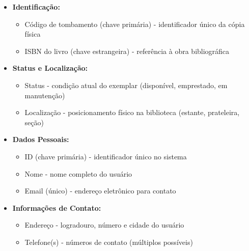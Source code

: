 \documentclass[12pt,a4paper]{article}
\begin{document}
\begin{conceptbox}[Exemplar]
\begin{itemize}[leftmargin=*]
    \item \textbf{Identificação:}
    \begin{itemize}
        \item Código de tombamento (chave primária) - identificador único da cópia física
        \item ISBN do livro (chave estrangeira) - referência à obra bibliográfica
    \end{itemize}
    \item \textbf{Status e Localização:}
    \begin{itemize}
        \item Status - condição atual do exemplar (disponível, emprestado, em manutenção)
        \item Localização - posicionamento físico na biblioteca (estante, prateleira, seção)
    \end{itemize}
\end{itemize}
\end{conceptbox}

\begin{conceptbox}[Usuário]
\begin{itemize}[leftmargin=*]
    \item \textbf{Dados Pessoais:}
    \begin{itemize}
        \item ID (chave primária) - identificador único no sistema
        \item Nome - nome completo do usuário
        \item Email (único) - endereço eletrônico para contato
    \end{itemize}
    \item \textbf{Informações de Contato:}
    \begin{itemize}
        \item Endereço - logradouro, número e cidade do usuário
        \item Telefone(s) - números de contato (múltiplos possíveis)
    \end{itemize}
\end{itemize}
\end{conceptbox}
\end{document}
